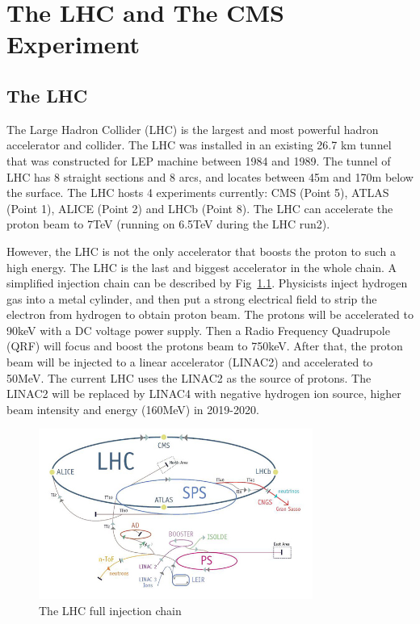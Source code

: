 \chapter{The LHC and The CMS Experiment}

\section{The LHC}

The Large Hadron Collider (LHC) is the largest and most powerful hadron accelerator and collider. The LHC was installed in an existing 26.7 km tunnel that was constructed for LEP machine between 1984 and 1989. The tunnel of LHC has 8 straight sections and 8 arcs, and locates between 45m and 170m below the surface. The LHC hosts 4 experiments currently: CMS (Point 5), ATLAS (Point 1), ALICE (Point 2) and LHCb (Point 8). The LHC can accelerate the proton beam to 7TeV (running on 6.5TeV during the LHC run2).

However, the LHC is not the only accelerator that boosts the proton to such a high energy. The LHC is the last and biggest accelerator in the whole chain. A simplified injection chain can be described by Fig~\ref{fig:c3lhclpsspslhc}. Physicists inject hydrogen gas into a metal cylinder, and then put a strong electrical field to strip the electron from hydrogen to obtain proton beam. The protons will be accelerated to 90keV with a DC voltage power supply. Then a Radio Frequency Quadrupole (QRF) will focus and boost the protons beam to 750keV. After that, the proton beam will be injected to a linear accelerator (LINAC2) and accelerated to 50MeV. The current LHC uses the LINAC2 as the source of protons. The LINAC2 will be replaced by LINAC4 with negative hydrogen ion source, higher beam intensity and energy (160MeV) in 2019-2020. 

\begin{figure}[htbp]
 \begin{center}
  \includegraphics[width=0.8\textwidth]{figures/c3/c3_lhc_lpsspslhc.jpg}
 \end{center}
 \caption{The LHC full injection chain}
 \label{fig:c3lhclpsspslhc}
\end{figure}

